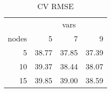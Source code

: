 \begin{table}

\caption{\label{tab:}CV RMSE}
\centering
\begin{tabular}[t]{r|r|r|r}
\hline
\multicolumn{1}{c|}{ } & \multicolumn{3}{c}{vars} \\
\cline{2-4}
nodes & 5 & 7 & 9\\
\hline
5 & 38.77 & 37.85 & 37.39\\
\hline
10 & 39.37 & 38.44 & 38.07\\
\hline
15 & 39.85 & 39.00 & 38.59\\
\hline
\end{tabular}
\end{table}